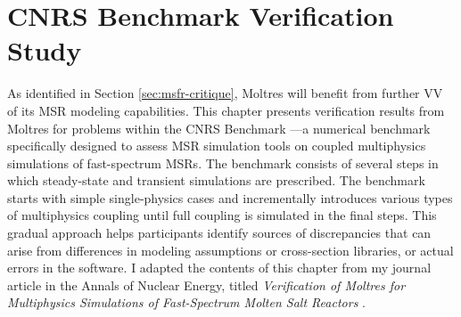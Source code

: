 \section{CNRS Benchmark Verification Study} \label{sec:cnrs-benchmark}

As identified in Section \ref{sec:msfr-critique},
Moltres will benefit from further \gls{VV} of its
\gls{MSR} modeling capabilities. This chapter presents verification
results from Moltres for problems within the CNRS Benchmark
\cite{tiberga_results_2020}---a numerical benchmark specifically designed to
assess \gls{MSR} simulation tools on coupled multiphysics simulations of
fast-spectrum \glspl{MSR}. The benchmark consists of several steps in which
steady-state and transient simulations are prescribed. The benchmark starts with simple
single-physics cases and incrementally introduces various types of
multiphysics coupling until full coupling is simulated in the final steps. This
gradual approach helps participants identify sources of discrepancies
that can arise from differences in modeling assumptions or
cross-section libraries, or actual errors in the software. I adapted the
contents of this chapter from my journal article in the Annals of Nuclear Energy, titled
\textit{Verification of Moltres for Multiphysics Simulations of Fast-Spectrum
Molten Salt Reactors}
\cite{park_verification_2022}.





